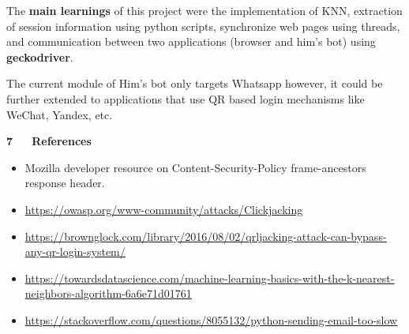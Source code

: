 \documentclass[12pt]{report}
\renewcommand{\_}{\kern-1.5pt\textunderscore\kern-1.5pt}
\begin{document}
\begin{FlushLeft}
The\textbf{ main learnings} of this project were the implementation of KNN, extraction of session information using python scripts, synchronize web pages using threads, and communication between two applications (browser and him’s bot) using \textbf{geckodriver}.
\end{FlushLeft}\par

\begin{FlushLeft}
The current module of Him’s bot\textbf{ }only targets Whatsapp however, it could be further extended to applications that use QR based login mechanisms like WeChat, Yandex, etc.
\end{FlushLeft}\par


\vspace{\baselineskip}

\vspace{\baselineskip}
\begin{FlushLeft}
{\fontsize{18pt}{21.6pt}\selectfont \textbf{7\ \ \  References}\par}
\end{FlushLeft}\par

\begin{itemize}
	\item Mozilla developer resource on Content-Security-Policy frame-ancestors response header.\par

	\item \href{https://owasp.org/www-community/attacks/Clickjacking}{\textcolor[HTML]{1155CC}{\ul{https://owasp.org/www-community/attacks/Clickjacking}}}\par

	\item \href{https://brownglock.com/library/2016/08/02/qrljacking-attack-can-bypass-any-qr-login-system/}{\textcolor[HTML]{1155CC}{\ul{https://brownglock.com/library/2016/08/02/qrljacking-attack-can-bypass-any-qr-login-system/}}}\par

	\item \href{https://towardsdatascience.com/machine-learning-basics-with-the-k-nearest-neighbors-algorithm-6a6e71d01761}{\textcolor[HTML]{1155CC}{\ul{https://towardsdatascience.com/machine-learning-basics-with-the-k-nearest-neighbors-algorithm-6a6e71d01761}}}\par

	\item \href{https://stackoverflow.com/questions/8055132/python-sending-email-too-slow}{\textcolor[HTML]{1155CC}{\ul{https://stackoverflow.com/questions/8055132/python-sending-email-too-slow}}}
\end{itemize}\par


\printbibliography
\end{document}

